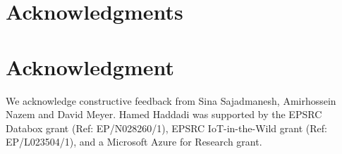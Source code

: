 \documentclass[10pt,journal,compsoc]{IEEEtran}
\begin{document}






%




\ifCLASSOPTIONcompsoc
  \section*{Acknowledgments}
\else
  \section*{Acknowledgment}
\fi

We acknowledge constructive feedback from Sina Sajadmanesh, Amirhossein Nazem and David Meyer. Hamed Haddadi was supported by the EPSRC Databox grant (Ref: EP/N028260/1), EPSRC IoT-in-the-Wild grant (Ref: EP/L023504/1), and a Microsoft Azure for Research grant. 



\ifCLASSOPTIONcaptionsoff
  \newpage
\fi
\end{document}

